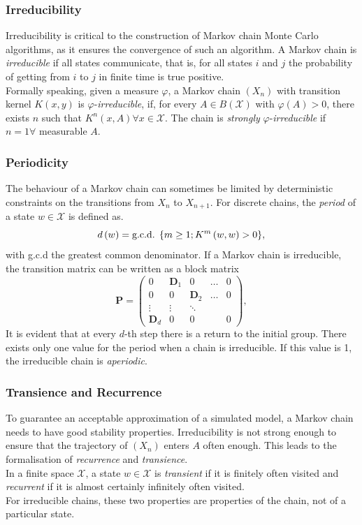 \subsubsection{Irreducibility} 
Irreducibility is critical to the construction of Markov chain Monte Carlo algorithms, as it ensures the convergence of such an algorithm. A Markov chain is \textit{irreducible} if all states communicate, that is, for all states $i$ and $j$ the probability of getting from $i$ to $j$ in finite time is true positive. \\
Formally speaking, given a measure $\varphi$, a Markov chain $\left(X_n\right)$ with transition kernel $K\left(x,y\right)$ is $\varphi$-\textit{irreducible}, if, for every $A\in B\left(\mathcal{X}\right)$ with $\varphi\left(A\right)>0$, there exists $n$ such that $K^n\left(x,A\right) \forall x\in\mathcal{X}$. The chain is \textit{strongly} $\varphi$-\textit{irreducible} if $n=1\forall$ measurable $A$.
\subsubsection{Periodicity} 
The behaviour of a Markov chain can sometimes be limited by deterministic constraints on the transitions from $X_n$ to $X_{n+1}$. For discrete chains, the \textit{period} of a state $w\in\mathcal{X}$ is defined as. 
\begin{equation*}
    d\left(w\right)=\hbox{g.c.d. } \lbrace m\geq 1;K^m\left(w,w\right)>0\rbrace,
\end{equation*}
with g.c.d the greatest common denominator. If a Markov chain is irreducible, the transition matrix can be written as a block matrix
\begin{equation}
    \pmb{P}=\begin{pmatrix}
    0 & \pmb{D}_1 & 0 & \dots & 0\\
    0 & 0 & \pmb{D}_2 & \dots & 0 \\
    \vdots & \vdots & \ddots  \\
    \pmb{D}_d & 0 & 0 & & 0
    \end{pmatrix},
\end{equation}
It is evident that at every $d$-th step there is a return to the initial group. There exists only one value for the period when a chain is irreducible. If this value is 1, the irreducible chain is \textit{aperiodic}.
 \subsubsection{Transience and Recurrence} 
To guarantee an acceptable approximation of a simulated model, a Markov chain needs to have good stability properties. Irreducibility is not strong enough to ensure that the trajectory of $\left(X_n\right)$ enters $A$ often enough. This leads to the formalisation of \textit{recurrence} and \textit{transience}.  \\
In a finite space $\mathcal{X}$, a state $w\in\mathcal{X}$ is \textit{transient} if it is finitely often visited and \textit{recurrent} if it is almost certainly infinitely often visited. \\
For irreducible chains, these two properties are properties of the chain, not of a particular state. 

